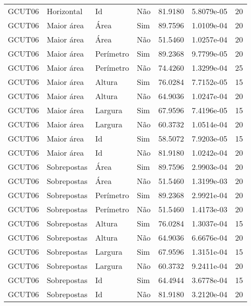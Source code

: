 \begin{tabular}{llllrrr}
GCUT06    & Horizontal  & Id        & Não         & 81.9180      & 5.8079e-05 & 20       \\
GCUT06    & Maior área  & Área      & Sim         & 89.7596      & 1.0109e-04 & 20       \\
GCUT06    & Maior área  & Área      & Não         & 51.5460      & 1.0257e-04 & 20       \\
GCUT06    & Maior área  & Perímetro & Sim         & 89.2368      & 9.7799e-05 & 20       \\
GCUT06    & Maior área  & Perímetro & Não         & 74.4260      & 1.3299e-04 & 25       \\
GCUT06    & Maior área  & Altura    & Sim         & 76.0284      & 7.7152e-05 & 15       \\
GCUT06    & Maior área  & Altura    & Não         & 64.9036      & 1.0247e-04 & 20       \\
GCUT06    & Maior área  & Largura   & Sim         & 67.9596      & 7.4196e-05 & 15       \\
GCUT06    & Maior área  & Largura   & Não         & 60.3732      & 1.0514e-04 & 20       \\
GCUT06    & Maior área  & Id        & Sim         & 58.5072      & 7.9203e-05 & 15       \\
GCUT06    & Maior área  & Id        & Não         & 81.9180      & 1.0242e-04 & 20       \\
GCUT06    & Sobrepostas & Área      & Sim         & 89.7596      & 2.9903e-04 & 20       \\
GCUT06    & Sobrepostas & Área      & Não         & 51.5460      & 1.3199e-03 & 20       \\
GCUT06    & Sobrepostas & Perímetro & Sim         & 89.2368      & 2.9921e-04 & 20       \\
GCUT06    & Sobrepostas & Perímetro & Não         & 51.5460      & 1.4173e-03 & 20       \\
GCUT06    & Sobrepostas & Altura    & Sim         & 76.0284      & 1.3037e-04 & 15       \\
GCUT06    & Sobrepostas & Altura    & Não         & 64.9036      & 6.6676e-04 & 20       \\
GCUT06    & Sobrepostas & Largura   & Sim         & 67.9596      & 1.3151e-04 & 15       \\
GCUT06    & Sobrepostas & Largura   & Não         & 60.3732      & 9.2411e-04 & 20       \\
GCUT06    & Sobrepostas & Id        & Sim         & 64.4944      & 3.6778e-04 & 15       \\
GCUT06    & Sobrepostas & Id        & Não         & 81.9180      & 3.2120e-04 & 20       \\
\hline
\end{tabular}